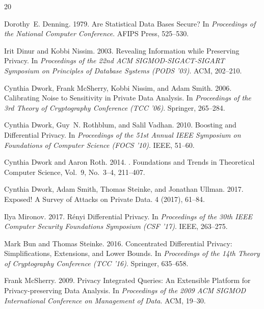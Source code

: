 \documentclass[sigconf,nonacm]{acmart}
\begin{document}

\begin{thebibliography}{20}

Dorothy~E. Denning. 1979.
\newblock Are Statistical Data Bases Secure?
\newblock In {\em Proceedings of the National Computer Conference}. AFIPS Press, 525--530.

Irit Dinur and Kobbi Nissim. 2003.
\newblock Revealing Information while Preserving Privacy.
\newblock In {\em Proceedings of the 22nd ACM SIGMOD-SIGACT-SIGART Symposium on Principles of Database Systems (PODS '03)}. ACM, 202--210.

Cynthia Dwork, Frank McSherry, Kobbi Nissim, and Adam Smith. 2006.
\newblock Calibrating Noise to Sensitivity in Private Data Analysis.
\newblock In {\em Proceedings of the 3rd Theory of Cryptography Conference (TCC '06)}. Springer, 265--284.

Cynthia Dwork, Guy~N. Rothblum, and Salil Vadhan. 2010.
\newblock Boosting and Differential Privacy.
\newblock In {\em Proceedings of the 51st Annual IEEE Symposium on Foundations of Computer Science (FOCS '10)}. IEEE, 51--60.

Cynthia Dwork and Aaron Roth. 2014.
.
\newblock Foundations and Trends in Theoretical Computer Science, Vol.~9, No.~3--4, 211--407.

Cynthia Dwork, Adam Smith, Thomas Steinke, and Jonathan Ullman. 2017.
\newblock Exposed! A Survey of Attacks on Private Data.
 4 (2017), 61--84.

Ilya Mironov. 2017.
\newblock R\'{e}nyi Differential Privacy.
\newblock In {\em Proceedings of the 30th IEEE Computer Security Foundations Symposium (CSF '17)}. IEEE, 263--275.

Mark Bun and Thomas Steinke. 2016.
\newblock Concentrated Differential Privacy: Simplifications, Extensions, and Lower Bounds.
\newblock In {\em Proceedings of the 14th Theory of Cryptography Conference (TCC '16)}. Springer, 635--658.

Frank McSherry. 2009.
\newblock Privacy Integrated Queries: An Extensible Platform for Privacy-preserving Data Analysis.
\newblock In {\em Proceedings of the 2009 ACM SIGMOD International Conference on Management of Data}. ACM, 19--30.


\end{thebibliography}
\end{document}
